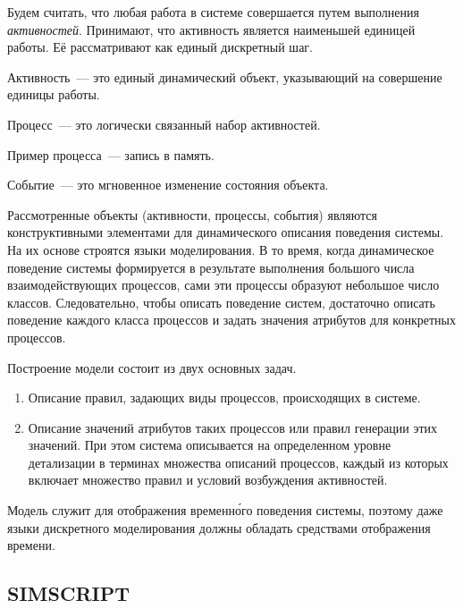 Будем считать, что любая работа в системе совершается путем выполнения \textit{активностей}. Принимают, что активность является наименьшей единицей работы. Её рассматривают как единый дискретный шаг.

\begin{dd}
    Активность~--- это единый динамический объект, указывающий на совершение единицы работы.
\end{dd}

\begin{dd}
    Процесс~--- это логически связанный набор активностей.
\end{dd}

Пример процесса~--- запись в память.

\begin{dd}
    Событие~--- это мгновенное изменение состояния объекта.
\end{dd}

Рассмотренные объекты (активности, процессы, события) являются конструктивными элементами для динамического описания поведения системы. На их основе строятся языки моделирования. В то время, когда динамическое поведение системы формируется в результате выполнения большого числа взаимодействующих процессов, сами эти процессы образуют небольшое число классов. Следовательно, чтобы описать поведение систем, достаточно описать поведение каждого класса процессов и задать значения атрибутов для конкретных процессов.

Построение модели состоит из двух основных задач.

\begin{enumerate}
    \item Описание правил, задающих виды процессов, происходящих в системе.
    \item Описание значений атрибутов таких процессов или правил генерации этих значений. При этом система описывается на определенном уровне детализации в терминах множества описаний процессов, каждый из которых включает множество правил и условий возбуждения активностей.
\end{enumerate}

Модель служит для отображения временн\'{о}го поведения системы, поэтому даже языки дискретного моделирования должны обладать средствами отображения времени.

\subsection{SIMSCRIPT}

